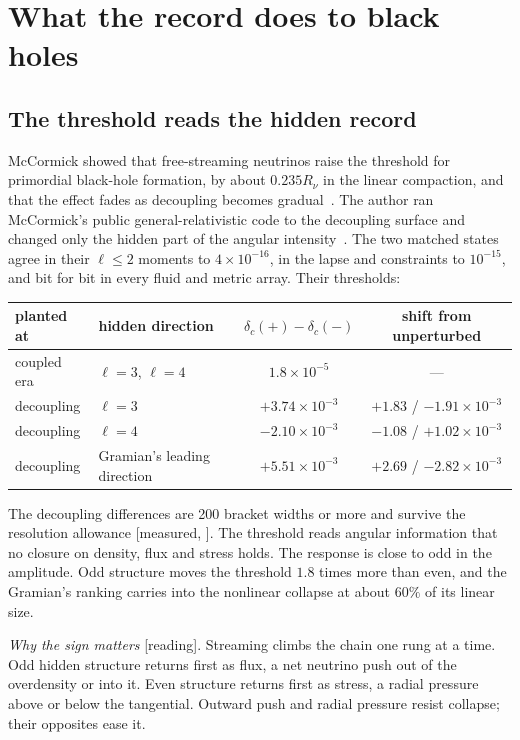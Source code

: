 \documentclass[11pt]{article}
\theoremstyle{definition}\newtheorem{hypothesis}{Hypothesis}\newtheorem{prediction}{Prediction}
\theoremstyle{remark}\newtheorem{remark}[theorem]{Remark}
\newcommand{\grade}[1]{\textsf{\small[#1]}}
\begin{document}
\section{What the record does to black holes}\label{sec:bh}

\subsection{The threshold reads the hidden record}
McCormick showed that free-streaming neutrinos raise the threshold for primordial black-hole formation, by about $0.235R_\nu$ in the linear compaction, and that the effect fades as decoupling becomes gradual~\cite{McC}. The author ran McCormick's public general-relativistic code to the decoupling surface and changed only the hidden part of the angular intensity~\cite{NU10}. The two matched states agree in their $\ell\le2$ moments to $4\times10^{-16}$, in the lapse and constraints to $10^{-15}$, and bit for bit in every fluid and metric array. Their thresholds:
\begin{center}\begin{tabular}{llcc}\toprule
planted at & hidden direction & $\delta_c(+)-\delta_c(-)$ & shift from unperturbed\\\midrule
coupled era & $\ell=3$, $\ell=4$ & $1.8\times10^{-5}$ & ---\\
decoupling & $\ell=3$ & $+3.74\times10^{-3}$ & $+1.83$ / $-1.91\times10^{-3}$\\
decoupling & $\ell=4$ & $-2.10\times10^{-3}$ & $-1.08$ / $+1.02\times10^{-3}$\\
decoupling & Gramian's leading direction & $+5.51\times10^{-3}$ & $+2.69$ / $-2.82\times10^{-3}$\\\bottomrule\end{tabular}\end{center}
The decoupling differences are 200 bracket widths or more and survive the resolution allowance \grade{measured, \cite{NU10}}. The threshold reads angular information that no closure on density, flux and stress holds. The response is close to odd in the amplitude. Odd structure moves the threshold $1.8$ times more than even, and the Gramian's ranking carries into the nonlinear collapse at about $60\%$ of its linear size.

\emph{Why the sign matters} \grade{reading}. Streaming climbs the chain one rung at a time. Odd hidden structure returns first as flux, a net neutrino push out of the overdensity or into it. Even structure returns first as stress, a radial pressure above or below the tangential. Outward push and radial pressure resist collapse; their opposites ease it.
\end{document}
